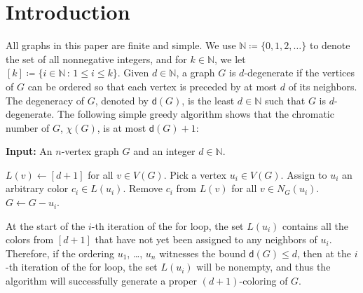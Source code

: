 \documentclass[11pt]{article}
\theoremstyle{slantthm}
\numberwithin{equation}{section}
\theoremstyle{definition}
\renewcommand{\leq}{\leqslant}
\newcommand{\defeq}{\coloneqq}
\numberwithin{equation}{section}
\newcommand{\N}{\mathbb{N}}
\newcommand{\0}{\varnothing}
\newcommand{\set}[1]{\{#1\}}
\newcommand{\emphd}[1]{{\fontseries{b}\selectfont\textsf{#1}}}
\newcommand{\de}{\mathsf{d}}
\newcommand{\blank}{\mathsf{blank}}
\begin{document}



\section{Introduction}\label{sec:intro}


    All graphs in this paper are finite and simple. We use $\N \defeq \set{0,1,2,\ldots}$ to denote the set of all nonnegative integers, and for $k \in \N$, we let $[k] \defeq \set{i \in \N \,:\, 1 \leq i \leq k}$. Given $d \in \N$, a graph $G$ is \emphd{$d$-degenerate} if the vertices of $G$ can be ordered so that each vertex is preceded by at most $d$ of its neighbors. The \emphd{degeneracy} of $G$, denoted by $\de(G)$, is the least $d \in \N$ such that $G$ is $d$-degenerate. The following simple greedy algorithm shows that the chromatic number of $G$, $\chi(G)$, is at most $\de(G) + 1$:
    
    \begin{algorithm}[h]%
    \caption{Greedy coloring}\label{alg:greedy}
    \begin{algorithmic}[1]

        \medskip
    
        \Statex \textbf{Input:} An $n$-vertex graph $G$ and an integer $d \in \N$.

        \medskip
        
        \State $L(v) \gets [d+1]$ for all $v \in V(G)$.
            \State Pick a vertex $u_i \in V(G)$. \label{line:choice} %
                \State Assign to $u_i$ an arbitrary color $c_i \in L(u_i)$.
            \State Remove $c_i$ from $L(v)$ for all $v \in N_G(u_i)$.
            \State $G \gets G - u_i$.
        \EndFor
    \end{algorithmic}
\end{algorithm}

    \noindent At the start of the $i$-th iteration of the \textsf{for} loop, the set $L(u_i)$ contains all the colors from $[d+1]$ that have not yet been assigned to any neighbors of $u_i$. Therefore, if the ordering $u_1$, \ldots, $u_n$ witnesses the bound $\de(G) \leq d$, then at the $i$-th iteration of the \textsf{for} loop, the set $L(u_i)$ will be nonempty, and thus the algorithm will successfully generate a proper $(d+1)$-coloring of $G$. %
    
\end{document}
